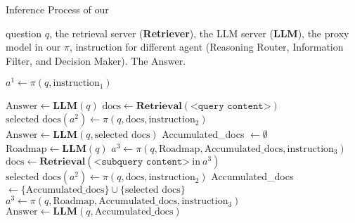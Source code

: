 \begin{algorithm}[h]
    \caption{Inference Process of our \modelname}
    \label{alg:infer_alg}
    \begin{algorithmic}[1]
        \INPUT question $q$, the retrieval server (\textbf{Retriever}), the LLM server (\textbf{LLM}), the proxy model in our \modelname $\pi$, instruction for different agent (Reasoning Router, Information Filter, and Decision Maker).
        \OUTPUT The Answer.

        \STATE $a^1 \leftarrow \pi(q, \text{instruction}_1)$ 

        \STATE $\text{Answer} \leftarrow \textbf{LLM}(q)$ 
        \STATE $\text{docs} \leftarrow \textbf{Retrieval}(\texttt{<query content>})$
        \STATE $\text{selected docs} (a^2) \leftarrow \pi(q, \text{docs}, \text{instruction}_2)$ 
        \STATE $\text{Answer} \leftarrow \textbf{LLM}(q, \text{selected docs})$ 
        \ELSE
        \STATE Accumulated\_docs $\leftarrow \emptyset$ 
        \STATE $\text{Roadmap}\leftarrow \textbf{LLM}(q)$ 
        \STATE $a^3 \leftarrow \pi(q, \text{Roadmap}, \text{Accumulated\_docs}, \text{instruction}_3)$ 
            \STATE $\text{docs} \leftarrow \textbf{Retrieval}(\texttt{<subquery content>}~\text{in}~a^3)$
            \STATE $\text{selected docs} (a^2) \leftarrow \pi(q, \text{docs}, \text{instruction}_2)$ 
            \STATE Accumulated\_docs $\leftarrow \{\text{Accumulated\_docs}\} \cup \{\text{selected docs}\}$ 
            \STATE $a^3 \leftarrow \pi(q, \text{Roadmap}, \text{Accumulated\_docs}, \text{instruction}_3)$ 
        \ENDWHILE
        \STATE $\text{Answer} \leftarrow \textbf{LLM}(q, \text{Accumulated\_docs})$ 
        \ENDIF
    \end{algorithmic}
\end{algorithm}